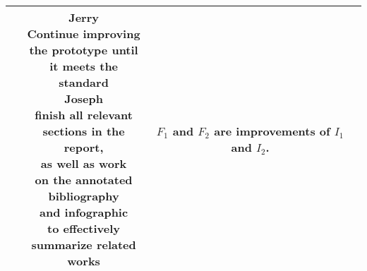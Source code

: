 \documentclass[12pt]{article}
\begin{document}
\begin{tabular}{|c|c|c|c|}
     & \makecell{
        \textbf{Jerry}\\ 
        Continue improving\\ the prototype until\\ it meets the\\ standard\\
        \textbf{Joseph}\\
        finish all relevant\\ sections in the report, \\
         as well as work\\ on the annotated\\ 
         bibliography\\ and infographic\\ to
         effectively \\summarize related works
     } 
     
     &\makecell{
       $F_1$ and $F_2$ are\\ improvements of\\ $I_1$ and $I_2$.
    } \\
     \hline
\end{tabular}
\end{document}
